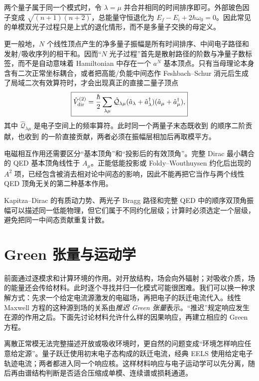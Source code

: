 两个量子属于同一个模式时，令 $\lambda=\mu$ 并合并相同的时间排序即可。外部玻色因子变成
$\sqrt{(n+1)(n+2)}$，总能量守恒退化为
$E_f-E_i+2\hbar\omega_0=0$。因此常见的单模双光子过程只是上式的退化情形，而不是多量子交换的母定义。

更一般地，$N$ 个线性顶点产生的净多量子振幅是所有时间排序、中间电子路径和发射/吸收序列的相干和。因而“$N$ 光子过程”首先是散射路径的阶数与净量子数标签，而不是自动意味着 Hamiltonian 中存在一个 $a^N$ 基本顶点。只有当母理论本身含有二次正常坐标耦合，或者把高能/负能中间态作 Feshbach--Schur 消元后生成了局域二次有效算符时，才会出现真正的直接二量子顶点
\begin{equation}
\boxed{
\hat V_{\rm dir}^{(2)}
=\frac{\hbar}{2}
\sum_{\lambda\mu}
\hat{\mathcal Q}_{\lambda\mu}
(\hat a_\lambda+\hat a_\lambda^\dagger)
(\hat a_\mu+\hat a_\mu^\dagger),}
\label{eq:general_direct_quadratic_boson_vertex}
\end{equation}
其中 $\hat{\mathcal Q}_{\lambda\mu}$ 是电子空间上的频率算符。此时同一个两量子末态既收到 的顺序二阶贡献，也收到 的一阶直接贡献，两者必须在振幅层相加后再取模平方。

电磁相互作用还需要区分“基本顶角”和“投影后的有效顶角”。完整 Dirac 最小耦合的 QED 基本顶角线性于 $A_\mu$。正能低能投影或 Foldy--Wouthuysen 约化后出现的 $A^2$ 项，已经包含被消去相对论中间态的影响，因此不能再把它当作与两个线性 QED 顶角无关的第二种基本作用。

Kapitza--Dirac 的有质动力势、两光子 Bragg 路径和完整 QED 中的顺序双顶角振幅可以描述同一低能物理，但它们属于不同约化层级；计算时必须选定一个层级，避免把同一中间态贡献重复计数。

\section{Green 张量与运动学}

前面通过逐模求和计算环境的作用。对开放结构，场会向外辐射；对吸收介质，场的能量还会传给材料。此时逐个寻找并归一化模式可能很困难。我们可以换一种求解方式：先求一个给定电流源激发的电磁场，再把电子的跃迁电流代入。线性 Maxwell 方程的这种源到场的关系由\emph{推迟 Green 张量}表示。“推迟”规定响应发生在源的作用之后。下面先讨论材料允许什么样的因果响应，再建立相应的 Green 方程。

离散正常模无法完整描述开放或吸收环境时，更自然的问题变成“环境怎样响应任意给定源”。量子跃迁使用初末电子态构成的跃迁电流，经典 EELS 使用给定电子轨迹电流；两者都进入同一个响应核。这样材料响应与电子运动学可以先分离，随后再由谱结构判断是否适合压缩成单模、连续谱或损耗通道。

